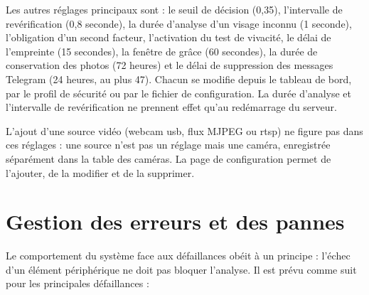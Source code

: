 \begin{maj}
Les autres réglages principaux sont : le seuil de décision (0,35), l'intervalle de revérification (0,8 seconde), la durée d'analyse d'un visage inconnu (1 seconde), l'obligation d'un second facteur, l'activation du test de vivacité, le délai de l'empreinte (15 secondes), la fenêtre de grâce (60 secondes), la durée de conservation des photos (72 heures) et le délai de suppression des messages Telegram (24 heures, au plus 47). Chacun se modifie depuis le tableau de bord, par le profil de sécurité ou par le fichier de configuration. La durée d'analyse et l'intervalle de revérification ne prennent effet qu'au redémarrage du serveur.
\end{maj}

\begin{maj}
L'ajout d'une source vidéo (webcam \gls{usb}, flux MJPEG ou \gls{rtsp}) ne figure pas dans ces réglages : une source n'est pas un réglage mais une caméra, enregistrée séparément dans la table des caméras. La page de configuration permet de l'ajouter, de la modifier et de la supprimer.
\end{maj}

\section{Gestion des erreurs et des pannes}

Le comportement du système face aux défaillances obéit à un principe : l'échec d'un élément périphérique ne doit pas bloquer l'analyse. Il est prévu comme suit pour les principales défaillances :

